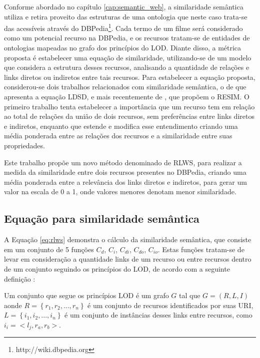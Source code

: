 Conforme abordado no capítulo \ref{cap:semantic_web}, a similaridade semântica utiliza e retira proveito das estruturas de uma ontologia que neste caso trata-se das acessíveis através do DBPedia\footnote{http://wiki.dbpedia.org}. Cada termo de um filme será considerado como um potencial recurso na DBPedia, e os recursos tratam-se de entidades de ontologias mapeadas no grafo dos princípios do \ac{LOD}. Diante disso, a métrica proposta é estabelecer uma equação de similaridade, utilizando-se de um modelo que considera a estrutura desses recursos, analisando a quantidade de relações e links diretos ou indiretos entre tais recursos. Para estabelecer a equação proposta, considerou-se dois trabalhos relacionados com similaridade semântica, o de \cite{PassantLDSD} que apresenta a equação \ac{LDSD}, e mais recentemente de \cite{PiaoResim}, que propõem o \ac{RESIM}. O primeiro trabalho tenta estabelecer a importância que um recurso tem em relação ao total de relações da união de dois recursos, sem preferências entre links diretos e indiretos, enquanto que \cite{PiaoResim} estende e modifica esse entendimento criando uma média ponderada entre as relações dos recursos e a similaridade entre suas propriedades.

Este trabalho propõe um novo método denominado de \ac{RLWS}, para realizar a medida da similaridade entre dois recursos presentes no DBPedia, criando uma média ponderada entre a relevância dos links diretos e indiretos, para gerar um valor na escala de 0 a 1, onde valores menores denotam menor similaridade.

\subsection{Equação para similaridade semântica}
\label{ssec:formula_rlws}

A Equação \ref{eq:rlws} demonstra o cálculo da similaridade semântica, que consiste em um conjunto de 5 funções  $C_d$, $C_i$, $C_{di}$, $C_{do}$, $C_{io}$. Estas funções tratam-se de levar em consideração a quantidade links de um recurso ou entre recursos dentro de um conjunto seguindo os princípios do \ac{LOD}, de acordo com a seguinte definição \citep{PiaoResim}:

\begin{definition}
Um conjunto que segue os princípios LOD é um grafo $G$ tal que $G = (R, L, I)$ aonde $R = \left\{r_1, r_2, ..., r_n\right\}$ é um conjunto de recursos identificados por suas URI, $L = \left\{i_1, i_2, ..., i_n\right\}$ é um conjunto de instâncias desses links entre recursos, como $i_i = <l_j, r_a, r_b>$.
\end{definition}

